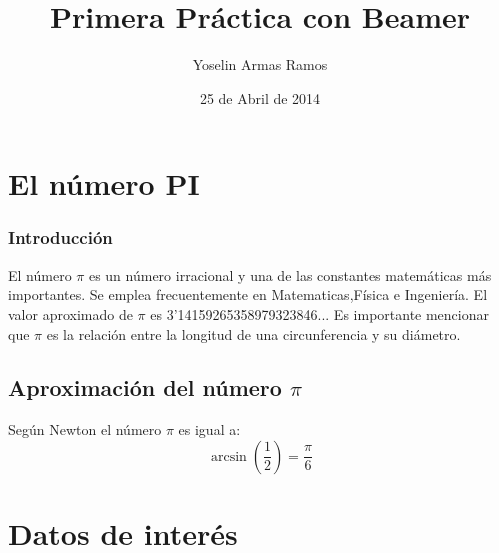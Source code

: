 \documentclass{beamer}        %
\title[T.E]{Primera Práctica con Beamer}
\author[Y.A.R]{Yoselin Armas Ramos}               %
\date[25/04/14]{25 de Abril de 2014}
\begin{document}

\begin{frame}  %

  \hspace*{7.0cm}
  \titlepage  %

\end{frame}  %
\section{El número PI} %


\begin{frame}         %

\frametitle{Introducción}   %
El número $\pi$ es un número irracional y una de las constantes matemáticas más importantes. 
Se emplea frecuentemente en Matematicas,Física e Ingeniería. El valor aproximado de $\pi$ es 3'14159265358979323846...
Es importante mencionar que $\pi$ es la relación entre la longitud de una circunferencia y su diámetro.
\subsection{Aproximación del número $\pi$}
Según Newton el número $\pi$ es igual a:
\begin{displaymath}
\arcsin \left(\frac{1}{2}\right) = \frac{\pi}{6}  
\end{displaymath}

\end{frame}

\section{Datos de interés} %
\end{document}
